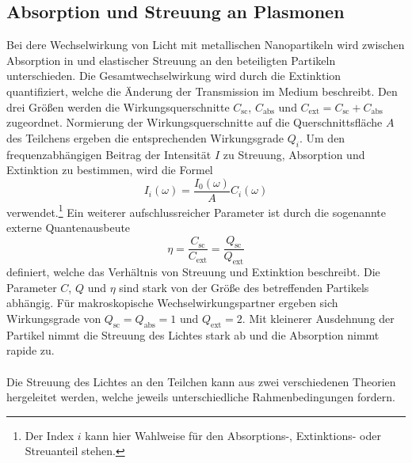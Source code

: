 \subsection{Absorption und Streuung an Plasmonen}
Bei dere Wechselwirkung von Licht mit metallischen Nanopartikeln wird zwischen Absorption in und elastischer Streuung an den beteiligten Partikeln unterschieden. Die Gesamtwechselwirkung wird durch die Extinktion quantifiziert, welche die Änderung der Transmission im Medium beschreibt.
Den drei Größen werden die Wirkungsquerschnitte $C_{\text{sc}}$, $C_{\text{abs}}$ und $C_{\text{ext}} = C_{\text{sc}} + C_{\text{abs}}$ zugeordnet.
Normierung der Wirkungsquerschnitte auf die Querschnittsfläche $A$ des Teilchens ergeben die entsprechenden Wirkungsgrade $Q_i$. Um den frequenzabhängigen Beitrag der Intensität $I$ zu Streuung, Absorption und Extinktion zu bestimmen, wird die Formel
\begin{equation}
  I_i(\omega) = \frac{I_0(\omega)}{A} C_i(\omega)
  \label{eqn:intensität}
\end{equation}
verwendet.\footnote{Der Index $i$ kann hier Wahlweise für den Absorptions-, Extinktions- oder Streuanteil stehen.} Ein weiterer aufschlussreicher Parameter ist durch die sogenannte externe Quantenausbeute
\begin{equation}
  \eta = \frac{C_{\text{sc}}}{C_{\text{ext}}} = \frac{Q_{\text{sc}}}{Q_{\text{ext}}}
\end{equation}
definiert, welche das Verhältnis von Streuung und Extinktion beschreibt. Die Parameter $C$, $Q$ und $\eta$ sind stark von der Größe des betreffenden Partikels abhängig. Für makroskopische Wechselwirkungspartner ergeben sich Wirkungsgrade von $Q_{\text{sc}} = {Q_{\text{abs}}} = 1$ und $Q_{\text{ext}} = 2$. Mit kleinerer Ausdehnung der Partikel nimmt die Streuung des Lichtes stark ab und die Absorption nimmt rapide zu.\\
\\
Die Streuung des Lichtes an den Teilchen kann aus zwei verschiedenen Theorien hergeleitet werden, welche jeweils unterschiedliche Rahmenbedingungen fordern.
